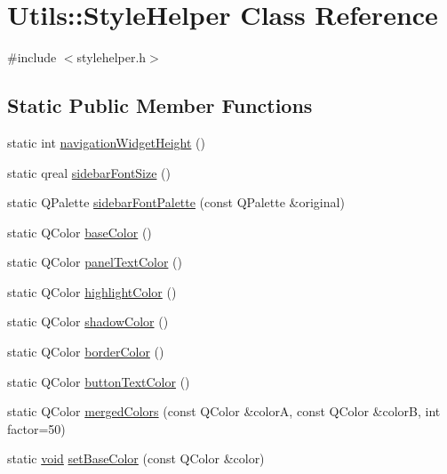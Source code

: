 \hypertarget{class_utils_1_1_style_helper}{\section{\-Utils\-:\-:\-Style\-Helper \-Class \-Reference}
\label{class_utils_1_1_style_helper}
}


{\ttfamily \#include $<$stylehelper.\-h$>$}

\subsection*{\-Static \-Public \-Member \-Functions}
\begin{DoxyCompactItemize}
\item 
static int \hyperlink{class_utils_1_1_style_helper_a23b834aa97cbfce9fa4eef57b93514a6}{navigation\-Widget\-Height} ()
\item 
static qreal \hyperlink{class_utils_1_1_style_helper_a0bd38fbc2c4fd8ec8a623db2cea918c4}{sidebar\-Font\-Size} ()
\item 
static \-Q\-Palette \hyperlink{class_utils_1_1_style_helper_a08c625a0478b81fc3374c2dbbaff376a}{sidebar\-Font\-Palette} (const \-Q\-Palette \&original)
\item 
static \-Q\-Color \hyperlink{class_utils_1_1_style_helper_a7d96ffba4103b4bac982826c2cb846e5}{base\-Color} ()
\item 
static \-Q\-Color \hyperlink{class_utils_1_1_style_helper_af7d9d75f293743dd14a2087caf3a5d56}{panel\-Text\-Color} ()
\item 
static \-Q\-Color \hyperlink{class_utils_1_1_style_helper_a9a504f9908e14e68eb4c55ab0d479074}{highlight\-Color} ()
\item 
static \-Q\-Color \hyperlink{class_utils_1_1_style_helper_a111b0bd7aa5c9f623ff12703fc300ec0}{shadow\-Color} ()
\item 
static \-Q\-Color \hyperlink{class_utils_1_1_style_helper_a857c029ec43ae5314d6a834f12c9a9fb}{border\-Color} ()
\item 
static \-Q\-Color \hyperlink{class_utils_1_1_style_helper_aa10831ed568eb03f5b4c6b0c16def7e9}{button\-Text\-Color} ()
\item 
static \-Q\-Color \hyperlink{class_utils_1_1_style_helper_afc6d9df6a8bf0d9d38fff4e2e8b10a58}{merged\-Colors} (const \-Q\-Color \&color\-A, const \-Q\-Color \&color\-B, int factor=50)
\item 
static \hyperlink{group___u_a_v_objects_plugin_ga444cf2ff3f0ecbe028adce838d373f5c}{void} \hyperlink{class_utils_1_1_style_helper_a81fb3b975c97e4928bceb3e9d99c76c8}{set\-Base\-Color} (const \-Q\-Color \&color)

\end{DoxyCompactItemize}
